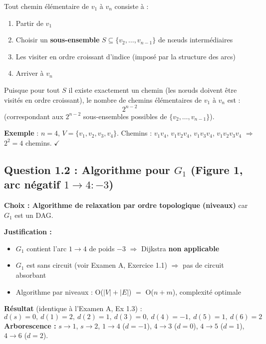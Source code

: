 \documentclass[12pt,a4paper]{article}
\begin{document}
\begin{solution}
Tout chemin élémentaire de $v_1$ à $v_n$ consiste à :
\begin{enumerate}
    \item Partir de $v_1$
    \item Choisir un \textbf{sous-ensemble} $S \subseteq \{v_2,\ldots,v_{n-1}\}$ de nœuds intermédiaires
    \item Les visiter en ordre croissant d'indice (imposé par la structure des arcs)
    \item Arriver à $v_n$
\end{enumerate}

Puisque pour tout $S$ il existe exactement un chemin (les nœuds doivent être visités en ordre croissant), le nombre de chemins élémentaires de $v_1$ à $v_n$ est :
\[
\boxed{2^{n-2}}
\]
(correspondant aux $2^{n-2}$ sous-ensembles possibles de $\{v_2,\ldots,v_{n-1}\}$).

\textbf{Exemple} : $n=4$, $V=\{v_1,v_2,v_3,v_4\}$. Chemins : $v_1 v_4$, $v_1 v_2 v_4$, $v_1 v_3 v_4$, $v_1 v_2 v_3 v_4$ $\Rightarrow$ $2^2=4$ chemins. $\checkmark$
\end{solution}

\subsection{Question 1.2 : Algorithme pour $G_1$ (Figure 1, arc négatif $1\to 4 : -3$)}

\begin{solution}
\textbf{Choix : Algorithme de relaxation par ordre topologique (niveaux)} car $G_1$ est un DAG.

\textbf{Justification :}
\begin{itemize}
    \item $G_1$ contient l'arc $1 \to 4$ de poids $-3$ $\Rightarrow$ Dijkstra \textcolor{importantrouge}{\textbf{non applicable}}
    \item $G_1$ est sans circuit (voir Examen A, Exercice 1.1) $\Rightarrow$ pas de circuit absorbant
    \item Algorithme par niveaux : O($|V|+|E|$) $=$ O($n+m$), complexité optimale
\end{itemize}

\textbf{Résultat} (identique à l'Examen A, Ex 1.3) :
\[
d(s)=0,\ d(1)=2,\ d(2)=1,\ d(3)=0,\ d(4)=-1,\ d(5)=1,\ d(6)=2
\]
\textbf{Arborescence :} $s \!\to\! 1$, $s \!\to\! 2$, $1 \!\to\! 4$ ($d=-1$), $4 \!\to\! 3$ ($d=0$), $4 \!\to\! 5$ ($d=1$), $4 \!\to\! 6$ ($d=2$).
\end{solution}
\end{document}
